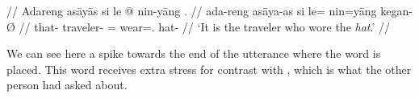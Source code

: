 \ex\begingl
	\glpreamble{} //
	\gla Adareng asāyās si le @ nin-yāng . //
	\glb ada-reng asāya-as si le= nin=yāng kegan-Ø //
	\glc that-\AargI{} traveler-\Parg{} \Rel{} \PatTI{}= wear=\TsgM{}.\Aarg{} 
		hat-\Top{} //
	\glft `It is the traveler who wore the \emph{hat}.' //
\endgl\xe

We can see here a spike towards the end of the utterance where the word 
 is placed. This word receives extra stress for 
contrast with , which is what the other person had asked 
about.
